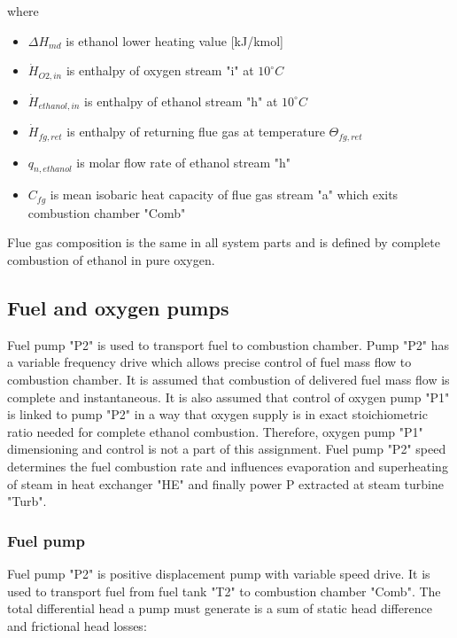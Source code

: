 \documentclass{article}
\begin{document}
	\noindent
	where
	
	\begin{itemize}
		\item $\Delta H_{md}$ is ethanol lower heating value [kJ/kmol]
		\item $\dot{H}_{O2,in}$ is enthalpy of oxygen stream "i" at $10^\circ C$
		\item $\dot{H}_{ethanol,in}$ is enthalpy of ethanol stream "h" at $10^\circ C$
		\item $\dot{H}_{fg,ret}$ is enthalpy of returning flue gas at temperature $\Theta_{fg,ret}$
		\item $q_{n,ethanol}$ is molar flow rate of ethanol stream "h"
		\item $C_{fg}$ is mean isobaric heat capacity of flue gas stream "a" which exits combustion chamber "Comb"
	\end{itemize}

	\noindent
	Flue gas composition is the same in all system parts and is defined by complete combustion of ethanol in pure oxygen.
	
	\subsection{Fuel and oxygen pumps}
	
	Fuel pump "P2" is used to transport fuel to combustion chamber. Pump "P2" 
	has a variable frequency drive which allows precise control of fuel mass 
	flow to combustion chamber. It is assumed that combustion of delivered fuel 
	mass flow is complete and instantaneous. It is also assumed that control of 
	oxygen pump "P1" is linked to pump "P2" in a way that oxygen supply is in 
	exact stoichiometric ratio needed for complete ethanol combustion. 
	Therefore, oxygen pump "P1" dimensioning and control is not a part of this 
	assignment. 
	Fuel pump "P2" speed determines the fuel combustion rate and influences 
	evaporation and superheating of steam in heat exchanger "HE" and finally 
	power P extracted at steam turbine "Turb".
	
	\subsubsection*{Fuel pump}
	
	Fuel pump "P2" is positive displacement pump with variable speed drive. It 
	is used to transport fuel from fuel tank "T2" to combustion chamber "Comb". 
	The total differential head a pump must generate is a sum of static head 
	difference and frictional head losses: 
	
\end{document}
